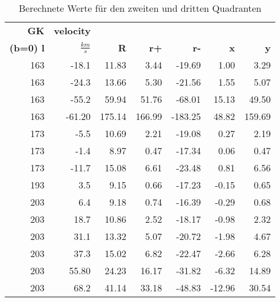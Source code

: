 \begin{table}[H]
    \centering
    \caption{Berechnete Werte für den zweiten und dritten Quadranten}
\begin{tabular}{|r|r|r|r|r|r|r|}
    \hline
    {\textbf{GK}} & {\textbf{velocity}} & {} &   {} &   {} &    {} &    {} \\
    {\textbf{(b=0) l}} & {\textbf{ $\si{}{\frac{km}{s}}$}} & {\textbf{R}} &   {\textbf{r+}} &   {\textbf{r-}}&    {\textbf{x}} &    {\textbf{y}} \\
    \hline
           163 &      -18.1 &      11.83 &       3.44 &     -19.69 &       1.00 &       3.29 \\
    
           163 &      -24.3 &      13.66 &       5.30 &     -21.56 &       1.55 &       5.07 \\
    
           163 &      -55.2 &      59.94 &      51.76 &     -68.01 &      15.13 &      49.50 \\
    
           163 &     -61.20 &     175.14 &     166.99 &    -183.25 &      48.82 &     159.69 \\
    \hline
           173 &       -5.5 &      10.69 &       2.21 &     -19.08 &       0.27 &       2.19 \\
    
           173 &       -1.4 &       8.97 &       0.47 &     -17.34 &       0.06 &       0.47 \\
    
           173 &      -11.7 &      15.08 &       6.61 &     -23.48 &       0.81 &       6.56 \\
    \hline
           193 &        3.5 &       9.15 &       0.66 &     -17.23 &      -0.15 &       0.65 \\
    \hline
           203 &        6.4 &       9.18 &       0.74 &     -16.39 &      -0.29 &       0.68 \\
    
           203 &       18.7 &      10.86 &       2.52 &     -18.17 &      -0.98 &       2.32 \\
    
           203 &       31.1 &      13.32 &       5.07 &     -20.72 &      -1.98 &       4.67 \\
    
           203 &       37.3 &      15.02 &       6.82 &     -22.47 &      -2.66 &       6.28 \\
    
           203 &      55.80 &      24.23 &      16.17 &     -31.82 &      -6.32 &      14.89 \\
    
           203 &       68.2 &      41.14 &      33.18 &     -48.83 &     -12.96 &      30.54 \\
    \hline
    \end{tabular} 
    \label{tab: zweiter Quadrant2} 
\end{table}
    

